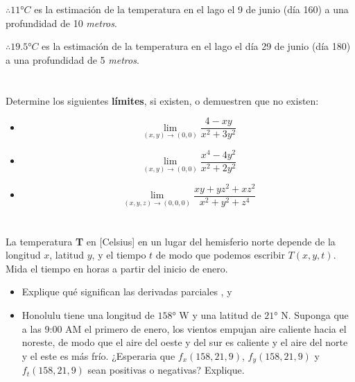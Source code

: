 \documentclass[12pt]{article}
\begin{document}
$\therefore 11°C$ es la estimación de la temperatura en el lago el 9 de junio (día 160) a una profundidad de 10 \textit{metros}.

$\therefore 19.5°C$ es la estimación de la temperatura en el lago el día 29 de junio (día 180) a una profundidad de 5 \textit{metros}.

\section{}

Determine los siguientes \textbf{límites}, si existen, o demuestren que no existen:

\begin{itemize}[format=\textbf]

\item $$\lim_{(x,y) \to (0,0)} \frac{4-xy}{x^2+3y^2}$$

\item $$\lim_{(x,y) \to (0,0)} \frac{x^4-4y^2}{x^2+2y^2}$$

\item $$\lim_{(x,y,z) \to (0,0,0)} \frac{xy+yz^2+xz^2}{x^2+y^2+z^4}$$

\end{itemize}

\section{}

La temperatura \textbf{T} en [Celsius] en un lugar del hemisferio norte depende de la longitud $x$, latitud $y$, y el tiempo $t$ de modo que podemos escribir $T(x, y, t)$. Mida el tiempo en horas a partir del inicio de enero.

\begin{itemize}[format=\textbf]

\item Explique qué significan las derivadas parciales , y 

\item Honolulu tiene una longitud de $158°$ W y una latitud de $21°$ N. Suponga que a las 9:00 AM el primero de enero, los vientos empujan aire caliente hacia el noreste, de modo que el aire del oeste y del sur es caliente y el aire del norte y el este es más frío. ¿Esperaria que $f_x(158, 21, 9)$, $f_y(158, 21, 9)$ y $f_t(158, 21, 9)$ sean positivas o
negativas? Explique.

\end{itemize}
\end{document}
